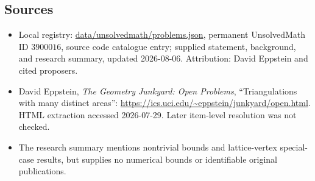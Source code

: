 \documentclass[11pt]{article}
\begin{document}
\subsection{Sources}
\begin{itemize}
\item Local registry: \url{data/unsolvedmath/problems.json}, permanent UnsolvedMath ID \(3900016\), source code catalogue entry; supplied statement, background, and research summary, updated 2026-08-06. Attribution: David Eppstein and cited proposers.
\item David Eppstein, \emph{The Geometry Junkyard: Open Problems}, ``Triangulations with many distinct areas'': \url{https://ics.uci.edu/~eppstein/junkyard/open.html}. HTML extraction accessed 2026-07-29. Later item-level resolution was not checked.
\item The research summary mentions nontrivial bounds and lattice-vertex special-case results, but supplies no numerical bounds or identifiable original publications.
\end{itemize}
\end{document}

